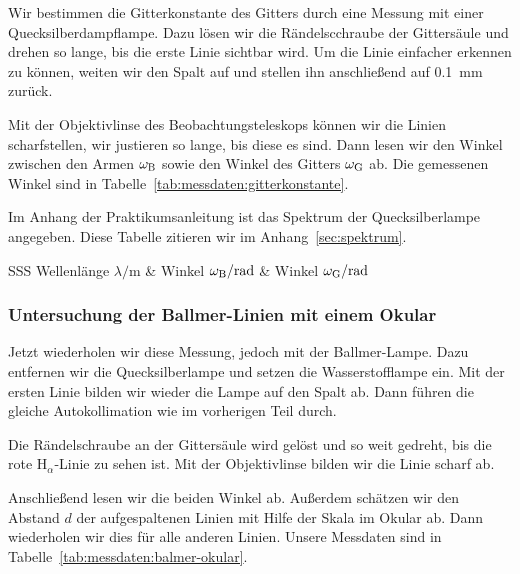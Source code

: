Wir bestimmen die Gitterkonstante des Gitters durch eine Messung mit einer
Quecksilberdampflampe. Dazu lösen wir die Rändelscchraube der Gittersäule und
drehen so lange, bis die erste Linie sichtbar wird. Um die Linie einfacher
erkennen zu können, weiten wir den Spalt auf und stellen ihn anschließend auf
\SI{0.1}{\milli\meter} zurück.

Mit der Objektivlinse des Beobachtungsteleskops können wir die Linien
scharfstellen, wir justieren so lange, bis diese es sind. Dann lesen wir den
Winkel zwischen den Armen $\omega_\text B$ sowie den Winkel des Gitters
$\omega_\text G$ ab. Die gemessenen Winkel sind in
Tabelle~\ref{tab:messdaten:gitterkonstante}.

Im Anhang der Praktikumsanleitung ist das Spektrum der Quecksilberlampe
angegeben. Diese Tabelle zitieren wir im Anhang~\ref{sec:spektrum}.

\begin{table}[htbp]
    \centering
    \begin{tabular}{SSS}
        {Wellenlänge $\lambda / \si\meter$} & {Winkel $\omega_\text B /
    \si\radian$}  & {Winkel $\omega_\text G / \si\radian$} \\
        \hline
    \end{tabular}
    \caption{%
        Messdaten für die Bestimmung der Gitterkonstanten mit der
        Quecksilberlampe.
    }
    \label{tab:messdaten:gitterkonstante}
\end{table}

\FloatBarrier
\subsubsection{Untersuchung der Ballmer-Linien mit einem Okular}

Jetzt wiederholen wir diese Messung, jedoch mit der Ballmer-Lampe. Dazu
entfernen wir die Quecksilberlampe und setzen die Wasserstofflampe ein. Mit der
ersten Linie bilden wir wieder die Lampe auf den Spalt ab. Dann führen die
gleiche Autokollimation wie im vorherigen Teil durch.

Die Rändelschraube an der Gittersäule wird gelöst und so weit gedreht, bis die
rote $\mathrm H_\alpha$-Linie zu sehen ist. Mit der Objektivlinse bilden wir
die Linie scharf ab.

Anschließend lesen wir die beiden Winkel ab. Außerdem schätzen wir den Abstand
$d$ der aufgespaltenen Linien mit Hilfe der Skala im Okular ab. Dann
wiederholen wir dies für alle anderen Linien. Unsere Messdaten sind in
Tabelle~\ref{tab:messdaten:balmer-okular}.

